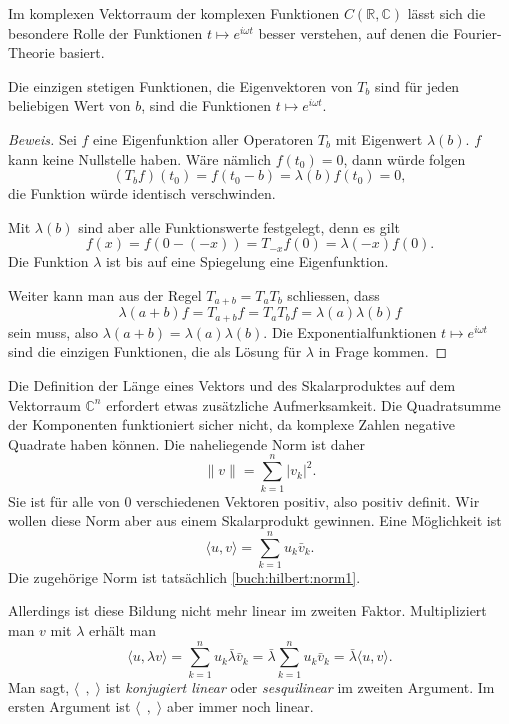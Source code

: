 Im komplexen Vektorraum der komplexen Funktionen $C(\mathbb R,\mathbb C)$
lässt sich die besondere Rolle der Funktionen $t\mapsto e^{i\omega t}$ 
besser verstehen, auf denen die Fourier-Theorie basiert.

\begin{satz}
Die einzigen stetigen Funktionen, die Eigenvektoren von $T_b$ sind für
jeden beliebigen Wert von $b$, sind die Funktionen $t\mapsto e^{i\omega t}$.
\end{satz}

\begin{proof}[Beweis]
Sei $f$ eine Eigenfunktion aller Operatoren $T_b$ mit Eigenwert $\lambda(b)$.
$f$ kann keine Nullstelle haben.
Wäre nämlich $f(t_0)=0$, dann würde folgen
\[
(T_bf)(t_0) = f(t_0-b) = \lambda(b) f(t_0) = 0,
\]
die Funktion würde identisch verschwinden.

Mit $\lambda(b)$ sind aber alle Funktionswerte festgelegt, denn es 
gilt
\[
f(x) = f(0-(-x)) = T_{-x}f(0) = \lambda(-x) f(0).
\]
Die Funktion $\lambda$ ist bis auf eine Spiegelung eine Eigenfunktion.

Weiter kann man aus der Regel $T_{a+b}=T_aT_b$ schliessen, dass
\[
\lambda(a+b) f
=
T_{a+b}f
=
T_aT_bf
=
\lambda(a)\lambda(b)f
\]
sein muss, also  $\lambda(a+b)=\lambda(a)\lambda(b)$.
Die Exponentialfunktionen $t\mapsto e^{i\omega t}$ sind die einzigen
Funktionen, die als Lösung für $\lambda$ in Frage kommen.
\end{proof}

Die Definition der Länge eines Vektors und des Skalarproduktes auf dem
Vektorraum $\mathbb C^n$ erfordert etwas zusätzliche Aufmerksamkeit.
Die Quadratsumme der Komponenten funktioniert sicher nicht, da komplexe
Zahlen negative Quadrate haben können.
Die naheliegende Norm ist daher
\begin{equation}
\|v\| = \sum_{k=1}^n |v_k|^2.
\label{buch:hilbert:norm1}
\end{equation}
Sie ist für alle von $0$ verschiedenen Vektoren positiv, also positiv
definit.
Wir wollen diese Norm aber aus einem Skalarprodukt gewinnen.
Eine Möglichkeit ist
\begin{equation}
\langle u,v\rangle = \sum_{k=1}^n u_k\bar{v}_k.
\label{hilbert:skalaransatz}
\end{equation}
Die zugehörige Norm ist tatsächlich \eqref{buch:hilbert:norm1}.

Allerdings ist diese Bildung nicht mehr linear im zweiten Faktor.
Multipliziert man $v$ mit $\lambda$ erhält man
\[
\langle u,\lambda v\rangle
=
\sum_{k=1}^n u_k\bar{\lambda} \bar{v}_k
=
\bar{\lambda}\sum_{k=1}^n u_k\bar{v}_k
=
\bar{\lambda}\langle u,v\rangle.
\]
Man sagt, $\langle\;\,,\;\rangle$ ist {\em konjugiert linear} oder
{\em sesquilinear} im zweiten Argument.
%
%
Im ersten Argument ist $\langle\;\,,\;\rangle$ aber immer noch linear.

